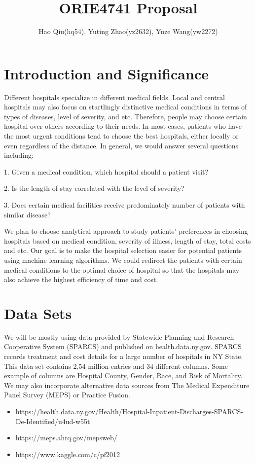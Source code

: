 \documentclass{article}
\title{ORIE4741 Proposal}
\author{Hao Qiu(hq54), Yuting Zhao(yz2632), Yuze Wang(yw2272)}
\begin{document}
\maketitle

\section{Introduction and Significance}
Different hospitals specialize in different medical fields. Local and central hospitals may also focus on startlingly distinctive medical conditions in terms of types of diseases, level of severity, and etc. Therefore, people may choose certain hospital over others according to their needs. In most cases, patients who have the most urgent conditions tend to choose the best hospitals, either locally or even regardless of the distance. In general, we would answer several questions including:
\bigbreak

1. Given a medical condition, which hospital should a patient visit?

2. Is the length of stay correlated with the level of severity?

3. Does certain medical facilities receive predominately number of patients with similar disease?

\bigbreak

\noindent
We plan to choose analytical approach to study patients' preferences in choosing hospitals based on medical condition, severity of illness, length of stay, total costs and etc. Our goal is to make the hospital selection easier for potential patients using machine learning algorithms. We could redirect the patients with certain medical conditions to the optimal choice of hospital so that the hospitals may also achieve the highest efficiency of time and cost. 

\section{Data Sets}
We will be mostly using data provided by Statewide Planning and Research Cooperative System (SPARCS) and published on health.data.ny.gov. SPARCS records treatment and cost details for a large number of hospitals in NY State. This data set contains 2.54 million entries and 34 different columns. Some example of columns are Hospital County, Gender, Race, and Risk of Mortality. We may also incorporate alternative data sources from The Medical Expenditure Panel Survey (MEPS) or Practice Fusion. 

\begin{itemize}
  \item https://health.data.ny.gov/Health/Hospital-Inpatient-Discharges-SPARCS-De-Identified/u4ud-w55t
  \item https://meps.ahrq.gov/mepsweb/
  \item https://www.kaggle.com/c/pf2012
\end{itemize}
\end{document}
